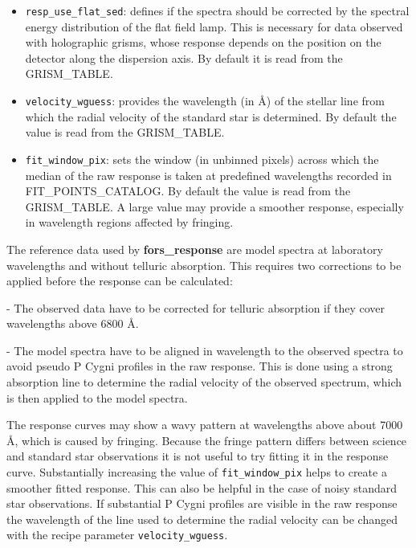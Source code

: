 \begin{itemize}

\item {\tt resp\_use\_flat\_sed}: defines if the spectra should be corrected by the spectral energy distribution of the flat field lamp. This is necessary for data observed with holographic grisms,
whose response depends on the position on the detector along the dispersion axis. By default it is read from the GRISM\_TABLE.

 \item {\tt velocity\_wguess}: provides the wavelength (in Å) of the stellar line from which the radial velocity of the standard star is determined. By default the value is read from the GRISM\_TABLE.
 
\item {\tt fit\_window\_pix}: sets the window (in unbinned pixels) across which the median of the raw response is taken at predefined wavelengths recorded in FIT\_POINTS\_CATALOG. By default the
value is read from the GRISM\_TABLE. A large value may provide a smoother response, especially in wavelength regions affected by fringing.

\end{itemize}

The reference data used by {\bf fors\_response} are model spectra at laboratory wavelengths and without telluric
absorption. This requires two corrections to be applied before the response can be calculated:

- The observed data have to be corrected for telluric absorption if they cover wavelengths above 6800 Å.

- The model spectra have to be aligned in wavelength to the observed spectra to avoid pseudo P Cygni profiles in the raw response. This is done using a strong absorption line to determine the radial velocity of the observed spectrum, which is then applied to the model spectra.

The response curves may show a wavy pattern at wavelengths above about 7000 Å, which is caused by fringing.
Because the fringe pattern differs between science and standard star observations it is not useful to try fitting
it in the response curve. Substantially increasing the value of {\tt fit\_window\_pix} helps to create a smoother fitted response. This can also be helpful in the case of noisy standard star observations.
If substantial P Cygni profiles are visible in the raw response the wavelength of the line used to determine the
radial velocity can be changed with the recipe parameter {\tt velocity\_wguess}.


